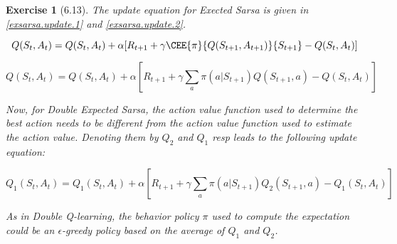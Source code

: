 \documentclass[a4paper]{scrartcl}
\theoremstyle{nonumberplain}
\newtheorem{ex}{Exercise}
\begin{document}
\begin{ex}[6.13]

The update equation for Exected Sarsa is given in \autoref{exsarsa.update.1} and \autoref{exsarsa.update.2}.

\begin{equation}
\label{exsarsa.update.1}
Q(S_t,A_t)=Q(S_t,A_t)+\alpha [R_{t+1} + \gamma \CEE{\pi}{Q(S_{t+1},A_{t+1})}{S_{t+1}} - Q(S_t, A_t)]
\end{equation}

\begin{equation}
\label{exsarsa.update.2}
Q(S_t,A_t)=Q(S_t,A_t)+\alpha [R_{t+1} + \gamma \sum_a \pi(a|S_{t+1}) Q(S_{t+1},a) - Q(S_t, A_t)]
\end{equation}

Now, for Double Expected Sarsa, the action value function used to determine the best action needs to be different from the action value function used to estimate the action value. Denoting them by $Q_2$ and $Q_1$ resp leads to the following update equation:

\begin{equation}
Q_1(S_t,A_t)=Q_1(S_t,A_t)+\alpha [R_{t+1} + \gamma \sum_a \pi(a|S_{t+1}) Q_2(S_{t+1},a) - Q_1(S_t, A_t)]
\end{equation}

As in Double Q-learning, the behavior policy $\pi$ used to compute the expectation could be an $\epsilon$-greedy policy based on the average of $Q_1$ and $Q_2$.

\end{ex}
\end{document}
